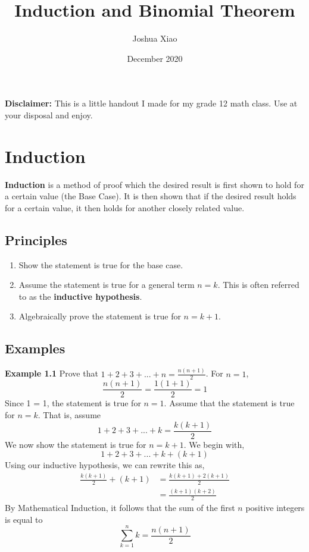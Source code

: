 \documentclass{article}
\title{Induction and Binomial Theorem}
\author{Joshua Xiao}
\date{December 2020}
\begin{document}
\maketitle

\textbf{Disclaimer: }This is a little handout I made for my grade 12 math class. Use at your disposal and enjoy. 

\section{Induction}

\textbf{Induction} is a method of proof which the desired result is first shown to hold for a certain value (the Base Case). It is then shown that if the desired result holds for a certain value, it then holds for another closely related value.

\bigskip

\subsection{Principles}

\begin{enumerate}
  \item Show the statement is true for the base case.
  \item Assume the statement is true for a general term $n = k$. This is often referred to as the \textbf{inductive hypothesis}.
  \item Algebraically prove the statement is true for $n = k + 1$.
\end{enumerate}

\bigskip

\subsection{Examples}

\textbf{Example 1.1} Prove that $1 + 2 + 3 + ... + n =\frac{n(n+1)}{2}$.
\newline
\bigskip
For $n = 1$,
$$\frac{n(n+1)}{2} = \frac{1(1+1)}{2} = 1$$
\newline
Since 1 = 1, the statement is true for $n = 1$. Assume that the statement is true for $n = k$. That is, assume
$$1 + 2 + 3 + ... + k = \frac{k(k+1)}{2}$$
We now show the statement is true for $n = k + 1$. We begin with,
$$1 + 2 + 3 + ... + k + (k + 1)$$
Using our inductive hypothesis, we can rewrite this as,
\begin{align*}
   \frac{k(k+1)}{2} + (k + 1) & = \frac{k(k+1)+2(k+1)}{2} \\
   & = \frac{(k+1)(k+2)}{2}
\end{align*}
By Mathematical Induction, it follows that the sum of the first $n$ positive integers is equal to 
$$\sum_{k = 1}^{n}k = \frac{n(n+1)}{2}$$
\newline
\end{document}
